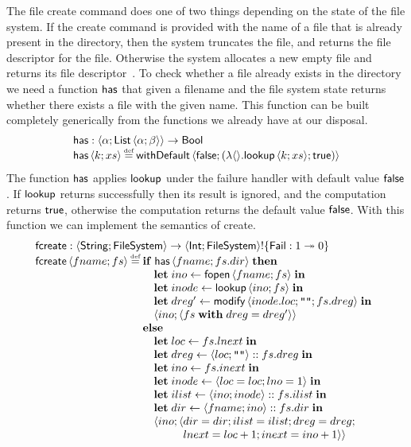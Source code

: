 \documentclass[12pt,phd,lfcs,twoside,openright,logo,leftchapter,normalheadings]{infthesis}
\theoremstyle{plain}
\theoremstyle{definition}
\begin{document}
The \UNIX{} file create command does one of two things depending on
the state of the file system. If the create command is provided with
the name of a file that is already present in the directory, then the
system truncates the file, and returns the file descriptor for the
file. Otherwise the system allocates a new empty file and returns its
file descriptor~\cite{RitchieT74}. To check whether a file already
exists in the directory we need a function $\mathsf{has}$ that given a
filename and the file system state returns whether there exists a file
with the given name. This function can be built completely generically
from the functions we already have at our disposal.
%
\[
  \bl
    \dec{has} : \Record{\alpha;\List\,\Record{\alpha;\beta}} \to \Bool\\
    \dec{has}\,\Record{k;xs} \defas \faild\,\Record{\False;(\lambda\Unit.\lookup\,\Record{k;xs};\True)}
  \el
\]
%
The function $\mathsf{has}$ applies $\mathsf{lookup}$ under the failure handler
with default value $\mathsf{false}$. If $\mathsf{lookup}$ returns successfully then
its result is ignored, and the computation returns $\mathsf{true}$, otherwise
the computation returns the default value $\mathsf{false}$.
%
With this function we can implement the semantics of create.
%
\[
  \bl
    \fcreate : \Record{\String;\FileSystem} \to \Record{\Int;\FileSystem} \eff \{\Fail : \UnitType \opto \ZeroType\}\\
    \fcreate\,\Record{fname;fs} \defas
      \ba[t]{@{}l}
        \If\;\dec{has}\,\Record{fname;fs.dir}\;\Then\\
          \quad\bl
            \Let\;ino   \revto \fopen\,\Record{fname;fs}\;\In\\
            \Let\;inode \revto \lookup\,\Record{ino;fs}\;\In\\
            \Let\;dreg' \revto \modify\,\Record{inode.loc; \strlit{}; fs.dreg}\;\In\\
            \Record{ino;\Record{fs\;\With\;dreg = dreg'}}
          \el\\
        \Else\\
        \quad\bl
          \Let\;loc \revto fs.lnext \;\In\\
          \Let\;dreg \revto \Record{loc; \strlit{}} \cons fs.dreg\;\In\\
          \Let\;ino \revto fs.inext \;\In\\
          \Let\;inode \revto \Record{loc=loc;lno=1}\;\In\\
          \Let\;ilist \revto \Record{ino;inode} \cons fs.ilist \;\In\\
          \Let\;dir   \revto \Record{fname; ino} \cons fs.dir \;\In\\
          \Record{ino;\Record{
              \bl
                dir=dir;ilist=ilist;dreg=dreg;\\
                lnext=loc+1;inext=ino+1}}
              \el
        \el
      \el
  \el
\]
\end{document}
